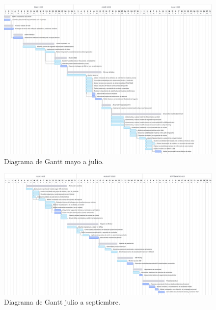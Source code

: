 \documentclass[
11pt, %
]{charter}
\begin{document}

\begin{landscape}
\begin{figure}[htpb]
\centering 
\includegraphics[height=.95\textheight]{./Figuras/Gantt-1.png}
\caption{Diagrama de Gantt mayo a julio.} 
\label{fig:diagGantt}
\end{figure}

\end{landscape}

\begin{landscape}
\begin{figure}[htpb]
\centering 
\includegraphics[height=.85\textheight]{./Figuras/Gantt-2.png}
\caption{Diagrama de Gantt julio a septiembre.} 
\label{fig:diagGantt}
\end{figure}

\end{landscape}
\end{document}
